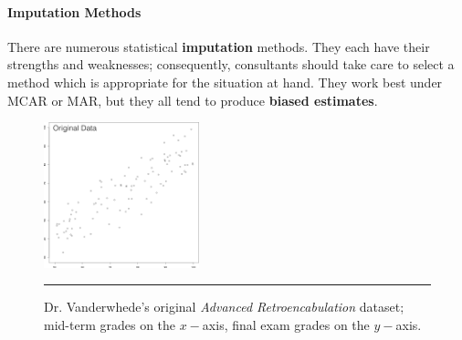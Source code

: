 \paragraph{Imputation Methods}
There are numerous statistical \textbf{imputation} methods. They each have their strengths and weaknesses; consequently, consultants should take care to select a method which is appropriate for the situation at hand. They work best under MCAR or MAR, but they all tend to produce \textbf{biased estimates}.
\begin{figure}[t]
\centering
\includegraphics[width=0.4\textwidth]{images/DP/original.png}
\caption[\small Dr. Vanderwhede's original \textit{Advanced Retroencabulation} dataset]{\small Dr. Vanderwhede's original \textit{Advanced Retroencabulation} dataset; mid-term grades on the $x-$axis, final exam grades on the $y-$axis.} \label{fig:ori}\hrule
\end{figure}
\afterpage{\FloatBarrier}
